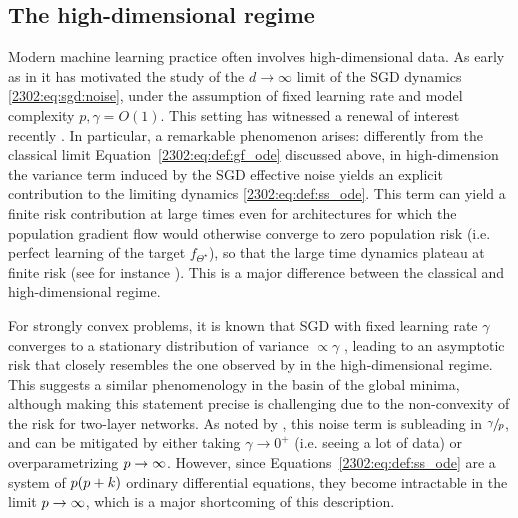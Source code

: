 \subsection{The high-dimensional regime}
\label{2302:sec:saadsolla}
Modern machine learning practice often involves high-dimensional data. As early as in
\citep{saad1995line,saad1996dynamics} it has motivated the study of the $d\to\infty$ limit of the SGD dynamics \eqref{2302:eq:sgd:noise}, under the assumption of fixed learning rate and model complexity $p,\gamma = O(1)$. This setting has witnessed a renewal of interest recently \cite{vershynin2018high,goldt2019dynamics,veiga2022phase,arous2022high}. In particular, a remarkable phenomenon arises: differently from the classical limit Equation~\eqref{2302:eq:def:gf_ode} discussed above, in high-dimension the variance term induced by the SGD effective noise yields an explicit contribution to the limiting dynamics \eqref{2302:eq:def:ss_ode}. This term can yield a finite risk contribution at large times even for architectures for which the population gradient flow would otherwise converge to zero population risk  (i.e. perfect learning of the target $f_{\Theta^{\star}}$), so that the large time dynamics plateau at finite risk (see for instance \cite{goldt2019dynamics,arous2022high}). This is a major difference between the classical and high-dimensional regime.

For strongly convex problems, it is known that SGD with fixed learning rate $\gamma$ converges to a stationary distribution of variance $\propto \gamma$ \cite{pflug1986stochastic,dieuleveut2020bridging}, leading to an asymptotic risk that closely resembles the one observed by \cite{saad1995line} in the high-dimensional regime. This suggests a similar phenomenology in the basin of the global minima, although making this statement precise is challenging due to the non-convexity of the risk for two-layer networks.  As noted by \cite{veiga2022phase}, this noise term is subleading in $\sfrac{\gamma}{p}$, and can be mitigated by either taking $\gamma\to 0^{+}$ (i.e. seeing a lot of data) or overparametrizing $p\to\infty$. However, since Equations~\eqref{2302:eq:def:ss_ode} are a system of $p(p+k)$ ordinary differential equations, they become intractable in the limit $p\to\infty$, which is a major shortcoming of this description. 


